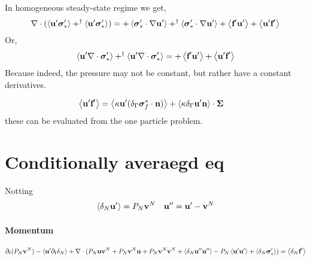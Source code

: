 In homogeneous steady-state regime we get, 
\begin{equation}
         \mathbf{\nabla}\cdot (\left<\textbf{u}'\bm\sigma_*'\right>
         + ^\dagger\left<\textbf{u}'\bm\sigma_*'\right>)
         = 
    + \left<\bm\sigma_*'\cdot \mathbf{\nabla} \textbf{u}'\right>
    + ^\dagger \left<\bm\sigma_*'\cdot \mathbf{\nabla} \textbf{u}'\right>
    + \left<\textbf{f}'\textbf{u}'\right>
    + \left<\textbf{u}'\textbf{f}'\right>
\end{equation}
Or, 
\begin{equation}
         \left<\textbf{u}'\mathbf{\nabla}\cdot \bm\sigma_*'\right>
         + ^\dagger\left<\textbf{u}'\mathbf{\nabla}\cdot \bm\sigma_*'\right>
         = 
    + \left<\textbf{f}'\textbf{u}'\right>
    + \left<\textbf{u}'\textbf{f}'\right>
\end{equation}
Because indeed, the pressure may not be constant, but rather have a constant derivatives.  


\begin{align}
    \left<\textbf{u}' \textbf{f}'\right>
    &=
    \left<\kappa   \textbf{u}'(\delta_{\Gamma}  \bm\sigma_f^* \cdot \textbf{n})\right>
    + \left<\kappa   \delta_{\Gamma} \textbf{u}'  \textbf{n}\right>\cdot \bm\Sigma
\end{align}
these can be evaluated from the one particle problem. 

\section{Conditionally averaegd eq}
Notting 
\begin{align}
    \left<\delta_N \textbf{u}'\right> = P_N \textbf{v}^N 
     && \textbf{u}'' = \textbf{u}' - \textbf{v}^N
\end{align}

\paragraph{Momentum }
\begin{align}
    \partial_t (P_N \textbf{v}^N) 
    - \left<\textbf{u}'\partial_t \delta_N\right>
    + \mathbf{\nabla}\cdot (
          P_N \textbf{u}\textbf{v}^N
        + P_N \textbf{v}^N \textbf{u}
        + P_N \textbf{v}^N \textbf{v}^N
        + \left<\delta_N \textbf{u}''\textbf{u}''\right>
        - P_N \left<\textbf{u}'\textbf{u}'\right>
        + \left<\delta_N \bm\sigma_*'\right> )
    = \left<\delta_N \textbf{f}'\right>
\end{align}

